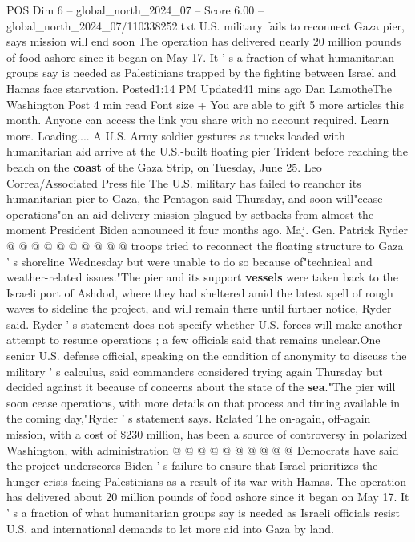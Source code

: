 \begin{textsample}{POS Dim 6 – global\_north\_2024\_07 – Score 6.00 – global\_north\_2024\_07/110338252.txt}  \label{ex:f6_pos_236}
U.S. military fails to reconnect Gaza pier, says mission will end soon The operation has delivered nearly 20 million pounds of food ashore since it began on May 17.
It ' s a fraction of what humanitarian groups say is needed as Palestinians trapped by the fighting between Israel and Hamas face starvation.
Posted1:14 PM Updated41 mins ago Dan LamotheThe Washington Post 4 min read Font size + You are able to gift 5 more articles this month.
Anyone can access the link you share with no account required.
Learn more.
Loading....
A U.S.
Army soldier gestures as trucks loaded with humanitarian aid arrive at the U.S.-built floating pier Trident before reaching the beach on the \textbf{coast} of the Gaza Strip, on Tuesday, June 25.
Leo Correa/Associated Press file The U.S. military has failed to reanchor its humanitarian pier to Gaza, the Pentagon said Thursday, and soon will"cease operations"on an aid-delivery mission plagued by setbacks from almost the moment President Biden announced it four months ago.
Maj.
Gen.
Patrick Ryder @ @ @ @ @ @ @ @ @ @ troops tried to reconnect the floating structure to Gaza ' s shoreline Wednesday but were unable to do so because of"technical and weather-related issues."The pier and its support \textbf{vessels} were taken back to the Israeli port of Ashdod, where they had sheltered amid the latest spell of rough waves to sideline the project, and will remain there until further notice, Ryder said.
Ryder ' s statement does not specify whether U.S. forces will make another attempt to resume operations ; a few officials said that remains unclear.One senior U.S. defense official, speaking on the condition of anonymity to discuss the military ' s calculus, said commanders considered trying again Thursday but decided against it because of concerns about the state of the \textbf{sea}."The pier will soon cease operations, with more details on that process and timing available in the coming day,"Ryder ' s statement says.
Related The on-again, off-again mission, with a cost of \$230 million, has been a source of controversy in polarized Washington, with administration @ @ @ @ @ @ @ @ @ @ Democrats have said the project underscores Biden ' s failure to ensure that Israel prioritizes the hunger crisis facing Palestinians as a result of its war with Hamas.
The operation has delivered about 20 million pounds of food ashore since it began on May 17.
It ' s a fraction of what humanitarian groups say is needed as Israeli officials resist U.S. and international demands to let more aid into Gaza by land.

\end{textsample}
